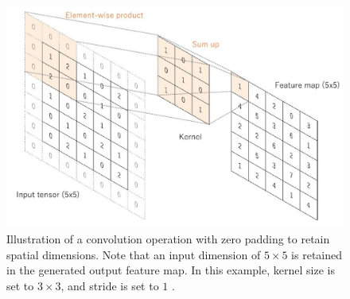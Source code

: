 \begin{figure}[H]
        \begin{center}
	    \includegraphics[scale=0.60]{images/Fundamentals/ConvolutionZeroPadding.JPG}
	    \caption[A Convolution Operation With Zero Padding.]{Illustration of a convolution operation with zero padding to retain spatial dimensions. Note that an input dimension of $5 \times 5$ is retained in the generated output feature map. In this example, kernel size is set to $3 \times 3$, and stride is set to $1$ \cite{articleCNNs}.}
	    \label{fig:ConvolutionZeroPadding}
	    \end{center}
\end{figure}


